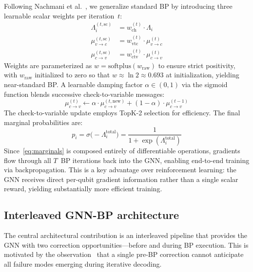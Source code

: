 \documentclass[a4paper,twocolumn,11pt,unpublished,nopdfoutputerror]{quantumarticle}
\newcommand{\llr}{\Lambda}
\begin{document}
Following Nachmani et al.~\cite{Nachmani2016Learning,Nachmani2018Deep}, we generalize standard BP by introducing three learnable scalar weights per iteration~$t$:
\begin{align}
\llr_i^{(t,\mathrm{sc})} &= w_\mathrm{ch}^{(t)} \cdot \llr_i \label{eq:wch}\\
\mu_{v \to c}^{(t,\mathrm{sc})} &= w_\mathrm{vtc}^{(t)} \cdot \mu_{v \to c}^{(t)} \label{eq:wvtc}\\
\mu_{c \to v}^{(t,\mathrm{sc})} &= w_\mathrm{ctv}^{(t)} \cdot \mu_{c \to v}^{(t)} \label{eq:wctv}
\end{align}
Weights are parameterized as $w = \mathrm{softplus}(w_\mathrm{raw})$ to ensure strict positivity, with $w_\mathrm{raw}$ initialized to zero so that $w \approx \ln 2 \approx 0.693$ at initialization, yielding near-standard BP. A learnable damping factor $\alpha \in (0,1)$ via the sigmoid function blends successive check-to-variable messages:
\begin{equation}
\mu_{c \to v}^{(t)} \leftarrow \alpha \cdot \mu_{c \to v}^{(t,\mathrm{new})} + (1-\alpha) \cdot \mu_{c \to v}^{(t-1)}
\label{eq:damp}
\end{equation}
The check-to-variable update employs TopK-2 selection for efficiency. The final marginal probabilities are:
\begin{equation}
p_i = \sigma\!\bigl(-\llr_i^{\mathrm{total}}\bigr) = \frac{1}{1 + \exp(\llr_i^{\mathrm{total}})}
\label{eq:marginals}
\end{equation}
Since~\eqref{eq:marginals} is composed entirely of differentiable operations, gradients flow through all $T$~BP iterations back into the GNN, enabling end-to-end training via backpropagation. This is a key advantage over reinforcement learning: the GNN receives direct per-qubit gradient information rather than a single scalar reward, yielding substantially more efficient training.

\subsection{Interleaved GNN-BP architecture}\label{sec:interleaved}

The central architectural contribution is an interleaved pipeline that provides the GNN with two correction opportunities---before and during BP execution. This is motivated by the observation~\cite{Gong2024GNN} that a single pre-BP correction cannot anticipate all failure modes emerging during iterative decoding.
\end{document}
